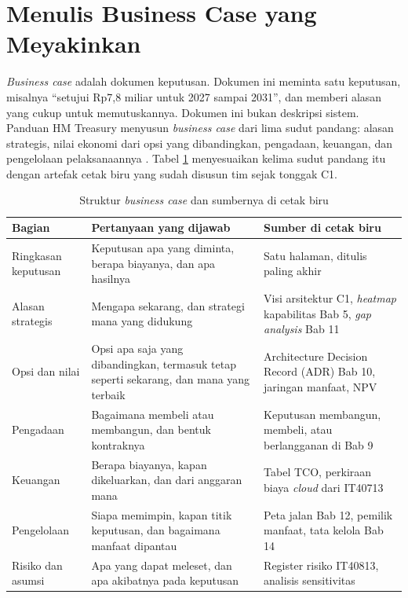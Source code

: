 \section{Menulis Business Case yang Meyakinkan}

\textit{Business case} adalah dokumen keputusan. Dokumen ini meminta satu
keputusan, misalnya ``setujui Rp7,8 miliar untuk 2027 sampai 2031'', dan
memberi alasan yang cukup untuk memutuskannya. Dokumen ini bukan deskripsi
sistem. Panduan HM Treasury menyusun \textit{business case} dari lima sudut
pandang: alasan strategis, nilai ekonomi dari opsi yang dibandingkan,
pengadaan, keuangan, dan pengelolaan pelaksanaannya \cite{c13-hmt2026}. Tabel
\ref{tab:ch13-struktur} menyesuaikan kelima sudut pandang itu dengan artefak
cetak biru yang sudah disusun tim sejak tonggak C1.

\begin{table}[!htb]
  \centering
  \caption{Struktur \textit{business case} dan sumbernya di cetak biru}
  \label{tab:ch13-struktur}
  \footnotesize
  \begin{tabularx}{\textwidth}{>{\raggedright\arraybackslash}p{2.4cm}
                               >{\raggedright\arraybackslash}X
                               >{\raggedright\arraybackslash}X}
    \hline
    \textbf{Bagian} & \textbf{Pertanyaan yang dijawab} &
      \textbf{Sumber di cetak biru} \\
    \hline
    Ringkasan keputusan & Keputusan apa yang diminta, berapa biayanya, dan apa
      hasilnya & Satu halaman, ditulis paling akhir \\
    \hline
    Alasan strategis & Mengapa sekarang, dan strategi mana yang didukung &
      Visi arsitektur C1, \textit{heatmap} kapabilitas Bab 5, \textit{gap
      analysis} Bab 11 \\
    \hline
    Opsi dan nilai & Opsi apa saja yang dibandingkan, termasuk tetap seperti
      sekarang, dan mana yang terbaik & Architecture Decision Record (ADR)
      Bab 10, jaringan manfaat, NPV \\
    \hline
    Pengadaan & Bagaimana membeli atau membangun, dan bentuk kontraknya &
      Keputusan membangun, membeli, atau berlangganan di Bab 9 \\
    \hline
    Keuangan & Berapa biayanya, kapan dikeluarkan, dan dari anggaran mana &
      Tabel TCO, perkiraan biaya \textit{cloud} dari IT40713 \\
    \hline
    Pengelolaan & Siapa memimpin, kapan titik keputusan, dan bagaimana
      manfaat dipantau & Peta jalan Bab 12, pemilik manfaat, tata kelola
      Bab 14 \\
    \hline
    Risiko dan asumsi & Apa yang dapat meleset, dan apa akibatnya pada
      keputusan & Register risiko IT40813, analisis sensitivitas \\
    \hline
  \end{tabularx}
\end{table}

